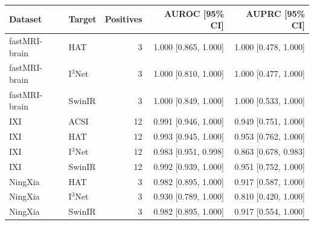 \begin{tabular}{llrrr}
\toprule
Dataset & Target & Positives & AUROC [95\% CI] & AUPRC [95\% CI] \\
\midrule
fastMRI-brain & HAT & 3 & 1.000 [0.865, 1.000] & 1.000 [0.478, 1.000] \\
fastMRI-brain & I$^3$Net & 3 & 1.000 [0.810, 1.000] & 1.000 [0.477, 1.000] \\
fastMRI-brain & SwinIR & 3 & 1.000 [0.849, 1.000] & 1.000 [0.533, 1.000] \\
\midrule
IXI & ACSI & 12 & 0.991 [0.946, 1.000] & 0.949 [0.751, 1.000] \\
IXI & HAT & 12 & 0.993 [0.945, 1.000] & 0.953 [0.762, 1.000] \\
IXI & I$^3$Net & 12 & 0.983 [0.951, 0.998] & 0.863 [0.678, 0.983] \\
IXI & SwinIR & 12 & 0.992 [0.939, 1.000] & 0.951 [0.752, 1.000] \\
\midrule
NingXia & HAT & 3 & 0.982 [0.895, 1.000] & 0.917 [0.587, 1.000] \\
NingXia & I$^3$Net & 3 & 0.930 [0.789, 1.000] & 0.810 [0.420, 1.000] \\
NingXia & SwinIR & 3 & 0.982 [0.895, 1.000] & 0.917 [0.554, 1.000] \\
\bottomrule
\end{tabular}
